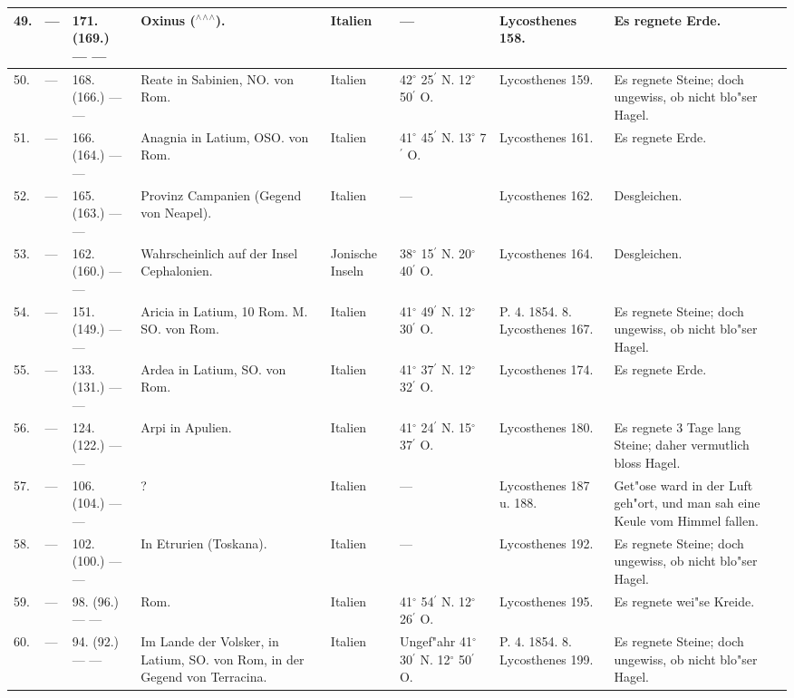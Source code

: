 \documentclass[a4paper, 8pt, oneside, polutonikogreek, german]{article}
\begin{document}
\begin{center}
\begin{longtable}{| p{5mm} | p{3mm} | p{15mm} | p{25mm} | p{20mm} | p{14mm} | p{17mm} | p{24mm} |}
        49. & --- & 171. (169.) --- --- & Oxinus ($^\wedge$$^\wedge$$^\wedge$). & Italien & --- & Lycosthenes 158. & Es regnete Erde. \\ \hline
        50. & --- & 168. (166.) --- --- & Reate in Sabinien, NO. von Rom. & Italien & 42$^\circ$ 25$^\prime$ N. 12$^\circ$ 50$^\prime$ O. & Lycosthenes 159. & Es regnete Steine; doch ungewiss, ob nicht blo"ser Hagel. \\ \hline
        51. & --- & 166. (164.) --- --- & Anagnia in Latium, OSO. von Rom. & Italien & 41$^\circ$ 45$^\prime$ N. 13$^\circ$ 7$^\prime$ O. & Lycosthenes 161. & Es regnete Erde. \\ \hline
        52. & --- & 165. (163.) --- --- & Provinz Campanien (Gegend von Neapel). & Italien & --- & Lycosthenes 162. & Desgleichen. \\ \hline
        53. & --- & 162. (160.) --- --- & Wahrscheinlich auf der Insel Cephalonien. & Jonische Inseln & 38$^\circ$ 15$^\prime$ N. 20$^\circ$ 40$^\prime$ O. & Lycosthenes 164. & Desgleichen. \\ \hline
        54. & --- & 151. (149.) --- --- & Aricia in Latium, 10 Rom. M. SO. von Rom. & Italien & 41$^\circ$ 49$^\prime$ N. 12$^\circ$ 30$^\prime$ O. & P. 4. 1854. 8. Lycosthenes 167. & Es regnete Steine; doch ungewiss, ob nicht blo"ser Hagel. \\ \hline
        55. & --- & 133. (131.) --- --- & Ardea in Latium, SO. von Rom. & Italien & 41$^\circ$ 37$^\prime$ N. 12$^\circ$ 32$^\prime$ O. & Lycosthenes 174. & Es regnete Erde. \\ \hline
        56. & --- & 124. (122.) --- --- & Arpi in Apulien. & Italien & 41$^\circ$ 24$^\prime$ N. 15$^\circ$ 37$^\prime$ O. & Lycosthenes 180. & Es regnete 3 Tage lang Steine; daher vermutlich bloss Hagel. \\ \hline
        57. & --- & 106. (104.) --- --- & ? & Italien & --- & Lycosthenes 187 u. 188. & Get"ose ward in der Luft geh"ort, und man sah eine Keule vom Himmel fallen. \\ \hline
        58. & --- & 102. (100.) --- --- & In Etrurien (Toskana). & Italien & --- & Lycosthenes 192. & Es regnete Steine; doch ungewiss, ob nicht blo"ser Hagel. \\ \hline
        59. & --- & 98. (96.) --- --- & Rom. & Italien & 41$^\circ$ 54$^\prime$ N. 12$^\circ$ 26$^\prime$ O. & Lycosthenes 195. & Es regnete wei"se Kreide. \\ \hline
        60. & --- & 94. (92.) --- --- & Im Lande der Volsker, in Latium, SO. von Rom, in der Gegend von Terracina. & Italien & Ungef"ahr 41$^\circ$ 30$^\prime$ N. 12$^\circ$ 50$^\prime$ O. & P. 4. 1854. 8. Lycosthenes 199. & Es regnete Steine; doch ungewiss, ob nicht blo"ser Hagel. \\ \hline

\end{longtable}
\end{center}
\end{document}
